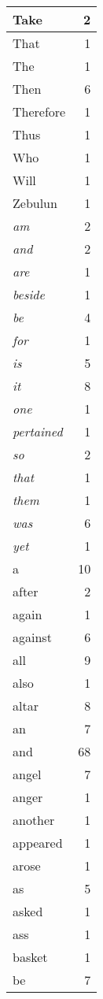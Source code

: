 \begin{center}
\begin{longtable}{l|r}
Take & 2\\ \hline 
That & 1\\ \hline 
The & 1\\ \hline 
Then & 6\\ \hline 
Therefore & 1\\ \hline 
Thus & 1\\ \hline 
Who & 1\\ \hline 
Will & 1\\ \hline 
Zebulun & 1\\ \hline 
\emph{am} & 2\\ \hline 
\emph{and} & 2\\ \hline 
\emph{are} & 1\\ \hline 
\emph{beside} & 1\\ \hline 
\emph{be} & 4\\ \hline 
\emph{for} & 1\\ \hline 
\emph{is} & 5\\ \hline 
\emph{it} & 8\\ \hline 
\emph{one} & 1\\ \hline 
\emph{pertained} & 1\\ \hline 
\emph{so} & 2\\ \hline 
\emph{that} & 1\\ \hline 
\emph{them} & 1\\ \hline 
\emph{was} & 6\\ \hline 
\emph{yet} & 1\\ \hline 
a & 10\\ \hline 
after & 2\\ \hline 
again & 1\\ \hline 
against & 6\\ \hline 
all & 9\\ \hline 
also & 1\\ \hline 
altar & 8\\ \hline 
an & 7\\ \hline 
and & 68\\ \hline 
angel & 7\\ \hline 
anger & 1\\ \hline 
another & 1\\ \hline 
appeared & 1\\ \hline 
arose & 1\\ \hline 
as & 5\\ \hline 
asked & 1\\ \hline 
ass & 1\\ \hline 
basket & 1\\ \hline 
be & 7\\ \hline 

\end{longtable}
\end{center}
